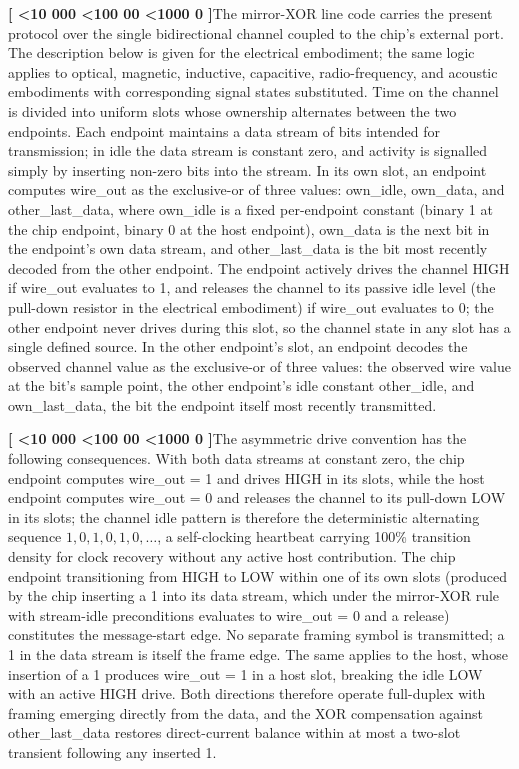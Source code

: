 \documentclass[12pt,letterpaper]{article}
\newcounter{para}
\newcommand{\padzero}{%
  \ifnum\value{para}<10 000\else%
  \ifnum\value{para}<100 00\else%
  \ifnum\value{para}<1000 0\else%
  \fi\fi\fi}
\newcommand{\para}{%
  \refstepcounter{para}\noindent\textbf{[\padzero\arabic{para}]}\hspace{0.5em}\ignorespaces}
\begin{document}
\para The mirror-XOR line code carries the present protocol over the single bidirectional channel coupled to the chip's external port. The description below is given for the electrical embodiment; the same logic applies to optical, magnetic, inductive, capacitive, radio-frequency, and acoustic embodiments with corresponding signal states substituted. Time on the channel is divided into uniform slots whose ownership alternates between the two endpoints. Each endpoint maintains a data stream of bits intended for transmission; in idle the data stream is constant zero, and activity is signalled simply by inserting non-zero bits into the stream. In its own slot, an endpoint computes wire\_out as the exclusive-or of three values: own\_idle, own\_data, and other\_last\_data, where own\_idle is a fixed per-endpoint constant (binary 1 at the chip endpoint, binary 0 at the host endpoint), own\_data is the next bit in the endpoint's own data stream, and other\_last\_data is the bit most recently decoded from the other endpoint. The endpoint actively drives the channel HIGH if wire\_out evaluates to 1, and releases the channel to its passive idle level (the pull-down resistor in the electrical embodiment) if wire\_out evaluates to 0; the other endpoint never drives during this slot, so the channel state in any slot has a single defined source. In the other endpoint's slot, an endpoint decodes the observed channel value as the exclusive-or of three values: the observed wire value at the bit's sample point, the other endpoint's idle constant other\_idle, and own\_last\_data, the bit the endpoint itself most recently transmitted.

\para The asymmetric drive convention has the following consequences. With both data streams at constant zero, the chip endpoint computes wire\_out = 1 and drives HIGH in its slots, while the host endpoint computes wire\_out = 0 and releases the channel to its pull-down LOW in its slots; the channel idle pattern is therefore the deterministic alternating sequence $1,0,1,0,1,0,\ldots$, a self-clocking heartbeat carrying 100\% transition density for clock recovery without any active host contribution. The chip endpoint transitioning from HIGH to LOW within one of its own slots (produced by the chip inserting a 1 into its data stream, which under the mirror-XOR rule with stream-idle preconditions evaluates to wire\_out = 0 and a release) constitutes the message-start edge. No separate framing symbol is transmitted; a 1 in the data stream is itself the frame edge. The same applies to the host, whose insertion of a 1 produces wire\_out = 1 in a host slot, breaking the idle LOW with an active HIGH drive. Both directions therefore operate full-duplex with framing emerging directly from the data, and the XOR compensation against other\_last\_data restores direct-current balance within at most a two-slot transient following any inserted 1.
\end{document}
